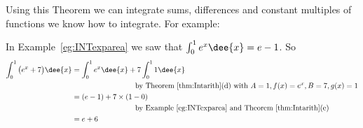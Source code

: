 Using this Theorem we can integrate sums, differences and constant multiples of
functions
we know how to integrate. For example:
\begin{eg}
In Example~\ref{eg:INTexparea} we saw that $\int_0^1 e^x\dee{x}=e-1$. So
\begin{align*}
\int_0^1\big(e^x+7\big)\dee{x}
&= \int_0^1 e^x\dee{x} + 7\int_0^1 1 \dee{x} \\
&\hspace{3cm}\text{by Theorem~\ref{thm:Intarith}(d) with
$A=1,f(x)=e^x,B=7,g(x)=1$} \\
&=(e-1)+7\times (1-0) \\
&\hspace{3cm}\text{by Example~\ref{eg:INTexparea} and
Theorem~\ref{thm:Intarith}(e)} \\
&=e+6
\end{align*}
\end{eg}

